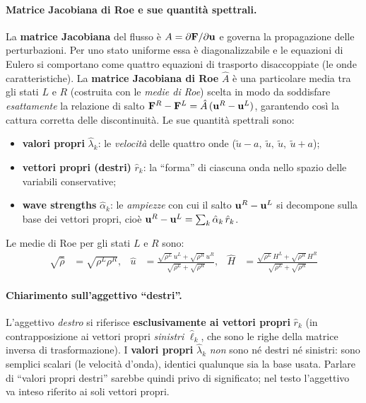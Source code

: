 \paragraph{Matrice Jacobiana di Roe e sue quantità spettrali.}
La \textbf{matrice Jacobiana} del flusso è $A = \partial \mathbf{F}/\partial \mathbf{u}$ e governa
la propagazione delle perturbazioni. Per uno stato uniforme essa è diagonalizzabile e
le equazioni di Eulero si comportano come quattro equazioni di trasporto disaccoppiate
(le onde caratteristiche). La \textbf{matrice Jacobiana di Roe} $\hat A$ è una
particolare media tra gli stati $L$ e $R$ (costruita con le \emph{medie di Roe}) scelta
in modo da soddisfare \emph{esattamente} la relazione di salto
$\mathbf{F}^R - \mathbf{F}^L = \hat A\,(\mathbf{u}^R - \mathbf{u}^L)$, garantendo così la cattura corretta
delle discontinuità. Le sue quantità spettrali sono:
\begin{itemize}
  \item \textbf{valori propri} $\hat\lambda_k$: le \emph{velocità} delle quattro onde
    ($\tilde u - a,\ \tilde u,\ \tilde u,\ \tilde u + a$);
  \item \textbf{vettori propri (destri)} $\hat r_k$: la ``forma'' di ciascuna onda
    nello spazio delle variabili conservative;
  \item \textbf{wave strengths} $\hat\alpha_k$: le \emph{ampiezze} con cui il salto
    $\mathbf{u}^R - \mathbf{u}^L$ si decompone sulla base dei vettori propri, cioè
    $\mathbf{u}^R - \mathbf{u}^L = \sum_k \hat\alpha_k\,\hat r_k$.
\end{itemize}
Le medie di Roe per gli stati $L$ e $R$ sono:
\begin{align}
  \sqrt{\hat{\rho}} &= \sqrt{\rho^L\rho^R}, &
  \hat{u} &= \frac{\sqrt{\rho^L}\,u^L + \sqrt{\rho^R}\,u^R}{\sqrt{\rho^L}+\sqrt{\rho^R}}, &
  \hat{H} &= \frac{\sqrt{\rho^L}\,H^L + \sqrt{\rho^R}\,H^R}{\sqrt{\rho^L}+\sqrt{\rho^R}}
\end{align}

\paragraph{Chiarimento sull'aggettivo ``destri''.}
L'aggettivo \emph{destro} si riferisce \textbf{esclusivamente ai vettori propri}
$\hat r_k$ (in contrapposizione ai vettori propri \emph{sinistri} $\hat\ell_k$, che
sono le righe della matrice inversa di trasformazione). I \textbf{valori propri}
$\hat\lambda_k$ \emph{non} sono né destri né sinistri: sono semplici scalari (le
velocità d'onda), identici qualunque sia la base usata. Parlare di ``valori propri
destri'' sarebbe quindi privo di significato; nel testo l'aggettivo va inteso riferito
ai soli vettori propri.

